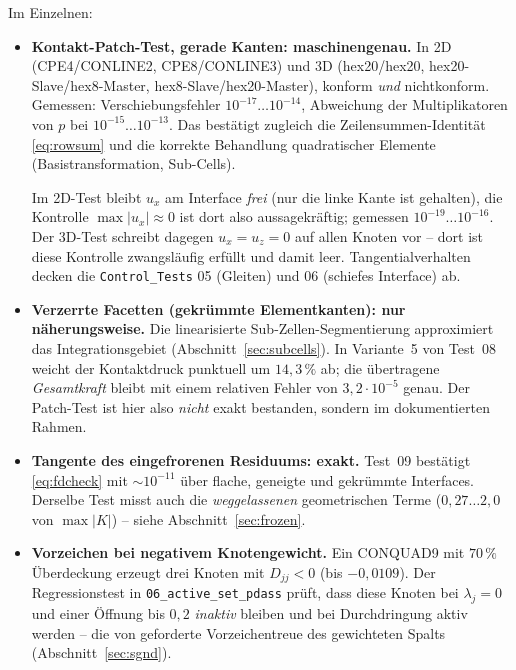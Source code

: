 \documentclass[a4paper,11pt]{article}
\def\bm#1{#1}%
\def\tilde#1{#1}%
\newcommand{\file}[1]{\texttt{\small #1}}
\begin{document}
\noindent Im Einzelnen:
\begin{itemize}\itemsep2pt
  \item \textbf{Kontakt-Patch-Test, gerade Kanten: maschinengenau.} In 2D (CPE4/CONLINE2,
        CPE8/CONLINE3) und 3D (hex20/hex20, hex20-Slave/hex8-Master, hex8-Slave/hex20-Master),
        konform \emph{und} nichtkonform. Gemessen: Verschiebungsfehler $10^{-17}\ldots10^{-14}$,
        Abweichung der Multiplikatoren von $p$ bei $10^{-15}\ldots10^{-13}$. Das bestätigt
        zugleich die Zeilensummen-Identität \eqref{eq:rowsum} und die korrekte Behandlung
        quadratischer Elemente (Basistransformation, Sub-Cells).

        Im 2D-Test bleibt $u_x$ am Interface \emph{frei} (nur die linke Kante ist gehalten), die
        Kontrolle $\max|u_x|\approx0$ ist dort also aussagekräftig; gemessen $10^{-19}\ldots10^{-16}$.
        Der 3D-Test schreibt dagegen $u_x=u_z=0$ auf allen Knoten vor -- dort ist diese Kontrolle
        zwangsläufig erfüllt und damit leer. Tangentialverhalten decken die
        \file{Control\_Tests} 05 (Gleiten) und 06 (schiefes Interface) ab.
  \item \textbf{Verzerrte Facetten (gekrümmte Elementkanten): nur näherungsweise.} Die
        linearisierte Sub-Zellen-Segmentierung approximiert das Integrationsgebiet
        (Abschnitt~\ref{sec:subcells}). In Variante~5 von Test~08 weicht der Kontaktdruck
        punktuell um $14{,}3\,\%$ ab; die übertragene \emph{Gesamtkraft} bleibt mit einem
        relativen Fehler von $3{,}2\cdot10^{-5}$ genau. Der Patch-Test ist hier also
        \emph{nicht} exakt bestanden, sondern im dokumentierten Rahmen.
  \item \textbf{Tangente des eingefrorenen Residuums: exakt.} Test~09 bestätigt
        \eqref{eq:fdcheck} mit $\sim10^{-11}$ über flache, geneigte und gekrümmte Interfaces.
        Derselbe Test misst auch die \emph{weggelassenen} geometrischen Terme
        ($0{,}27\ldots2{,}0$ von $\max|\bm K|$) -- siehe Abschnitt~\ref{sec:frozen}.
  \item \textbf{Vorzeichen bei negativem Knotengewicht.} Ein CONQUAD9 mit $70\,\%$ Überdeckung
        erzeugt drei Knoten mit $\tilde D_{jj}<0$ (bis $-0{,}0109$). Der Regressionstest in
        \file{06\_active\_set\_pdass} prüft, dass diese Knoten bei $\lambda_j=0$ und einer Öffnung
        bis $0{,}2$ \emph{inaktiv} bleiben und bei Durchdringung aktiv werden -- die von
        \citet[Abschn.~4.3]{popp2012} geforderte Vorzeichentreue des gewichteten Spalts
        (Abschnitt~\ref{sec:sgnd}).

\end{itemize}
\end{document}
